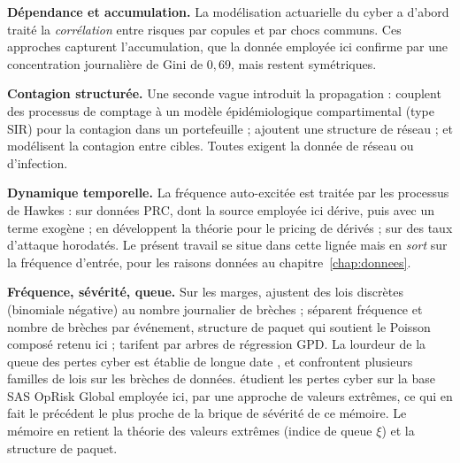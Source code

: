 \textbf{Dépendance et accumulation.} La modélisation actuarielle du cyber a d'abord traité la
\emph{corrélation} entre risques par copules \citep{BohmeKataria2006, HerathHerath2011}
et par chocs communs. Ces approches capturent l'accumulation, que la donnée employée ici
confirme par une concentration journalière de Gini de $0{,}69$, mais restent symétriques.

\textbf{Contagion structurée.} Une seconde vague introduit la propagation : \citet{HillairetLopez2021}
couplent des processus de comptage à un modèle épidémiologique compartimental (type
SIR) pour la contagion dans un portefeuille ; \citet{HillairetLopezDOultremontSpoorenberg2022}
ajoutent une structure de réseau ; \citet{XuHua2017} et \citet{Baldwin2017}
modélisent la contagion entre cibles. Toutes exigent la donnée de réseau ou d'infection.

\textbf{Dynamique temporelle.} La fréquence auto-excitée est traitée par les processus de
Hawkes : \citet{BessyRolandBoumezouedHillairet2021} sur données PRC, dont la source
employée ici dérive, puis \citet{BoumezouedCherkaouiHillairet2023} avec un terme exogène ;
\citet{HillairetReveillacRosenbaum2021} en développent la théorie pour le pricing de
dérivés ; \citet{Peng2016} sur des taux d'attaque horodatés. Le présent travail se situe dans cette
lignée mais en \emph{sort} sur la fréquence d'entrée, pour les raisons données au
chapitre~\ref{chap:donnees}.

\textbf{Fréquence, sévérité, queue.} Sur les marges, \citet{Edwards2016} ajustent des lois
discrètes (binomiale négative) au nombre journalier de brèches ; \citet{LuZhangZhu2024}
séparent fréquence et nombre de brèches par événement, structure de paquet qui soutient le
Poisson composé retenu ici ; \citet{FarkasLopezThomas2021} tarifent par arbres de régression
GPD. La lourdeur de la queue des pertes cyber est établie de longue date
\citep{MaillartSornette2010, wheatley2016}, et \citet{elingloperfido2017} confrontent plusieurs
familles de lois sur les brèches de données. \citet{elingwirfs2019} étudient les pertes cyber sur
la base SAS OpRisk Global employée ici, par une approche de valeurs extrêmes, ce qui en fait le
précédent le plus proche de la brique de sévérité de ce mémoire. Le mémoire en retient la théorie
des valeurs extrêmes (indice de queue $\xi$) et la structure de paquet.

